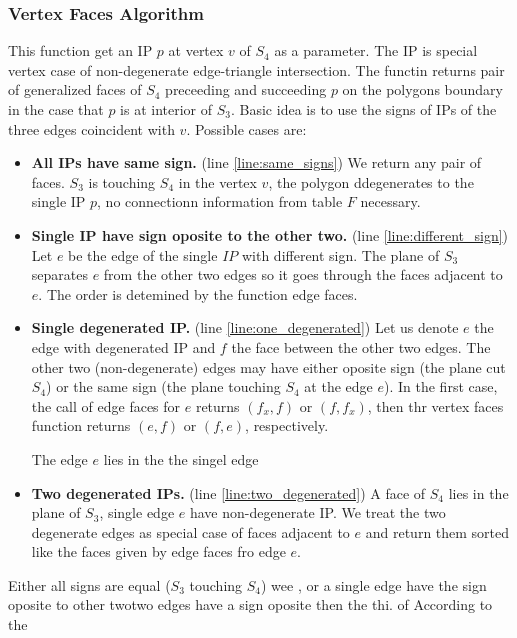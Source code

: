 \documentclass{elsarticle}
\begin{document}
\subsubsection{Vertex Faces Algorithm}
This function get an IP $p$ at vertex $v$ of $S_4$ as a parameter. The IP is special vertex case of non-degenerate edge-triangle intersection. 
The functin returns pair of generalized faces of $S_4$ preceeding and succeeding $p$ on the polygons boundary in the case that $p$ is at interior of $S_3$.
Basic idea is to use the signs of IPs of the three edges coincident with $v$. 
Possible cases are:
\begin{itemize}
 \item {\bf All IPs have same sign.} (line \ref{line:same_signs}) We return any pair of faces.  $S_3$ is touching $S_4$ 
 in the vertex $v$, the polygon ddegenerates to the single IP $p$, no connectionn information from table $F$ necessary.
 \item {\bf Single IP have sign oposite to the other two.} (line \ref{line:different_sign}) Let $e$ be the edge of the single $IP$ with different sign. 
 The plane of $S_3$ separates $e$ from the other two edges so it goes through the faces adjacent to $e$. The order is detemined by the function edge faces.
 \item {\bf Single degenerated IP.} (line \ref{line:one_degenerated}) Let us denote $e$ the edge with degenerated IP and $f$ the face between the other two edges.
 The other two (non-degenerate) edges may have either oposite sign (the plane cut $S_4$) or the same sign (the plane touching $S_4$ at the edge $e$).
 In the first case, the call of edge faces for $e$ returns $(f_x,f)$ or $(f,f_x)$, then thr vertex faces function returns $(e, f)$ or $(f, e)$, respectively.
 
 
 The edge $e$ lies in the the singel edge
 \item {\bf Two degenerated IPs.} (line \ref{line:two_degenerated}) A face of $S_4$ lies in the plane of $S_3$, single edge $e$ have non-degenerate IP.
 We treat the two degenerate edges as special case of faces adjacent to $e$ and return them sorted like the faces given by edge faces fro edge $e$.
\end{itemize}

Either all signs are equal ($S_3$ touching $S_4$) wee , or
a single edge have the sign oposite to other twotwo edges have a sign oposite then the thi. of According to the 
\end{document}
